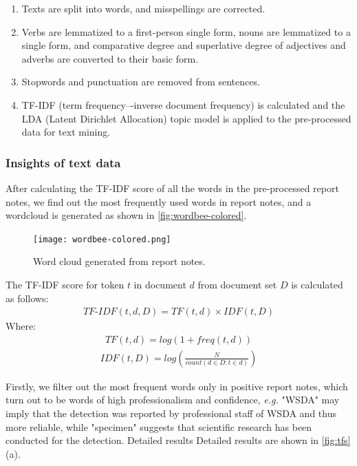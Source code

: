 \documentclass{mcmthesis}
\begin{document}
\begin{enumerate}
\item Texts are split into words, and misspellings are corrected.
\item Verbs are lemmatized to a first-person single form, nouns are lemmatized to a single form, and comparative degree and superlative degree of adjectives and adverbs are converted to their basic form.
\item Stopwords and punctuation are removed from sentences.
\item TF-IDF\cite{tfidf} (term frequency–-inverse document frequency) is calculated and the LDA\cite{lda} (Latent Dirichlet Allocation) topic model is applied to the pre-processed data for text mining.
\end{enumerate}

\subsubsection{Insights of text data}

After calculating the TF-IDF score of all the words in the pre-processed report notes, we find out the most frequently used words in report notes, and a wordcloud is generated as shown in \autoref{fig:wordbee-colored}.

\begin{figure}[h]
    \centering
    \texttt{[image: wordbee-colored.png]}
    \caption{Word cloud generated from report notes.}
    \label{fig:wordbee-colored}
\end{figure}

The TF-IDF score for token $t$ in document $d$ from document set $D$ is calculated as follows:
\begin{eqnarray}
TF\text{-}IDF(t,d,D) = TF(t,d) \times IDF(t,D)
\end{eqnarray}
Where:
\begin{eqnarray}
TF(t,d) = log(1+freq(t,d))
\end{eqnarray}
\begin{eqnarray}
IDF(t,D) = log(\frac{N}{count(d \in D : t \in d)})
\end{eqnarray}

Firstly, we filter out the most frequent words only in positive report notes, which turn out to be words of high professionalism and confidence, \emph{e.g.} "WSDA" may imply that the detection was reported by professional staff of WSDA and thus more reliable, while "specimen" suggests that scientific research has been conducted for the detection. Detailed results Detailed results are shown in \autoref{fig:tfs} (a).
\end{document}
